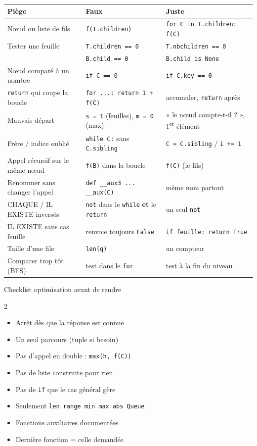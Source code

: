 \documentclass[10pt,a4paper]{article}
\newcommand{\code}[1]{\texttt{#1}}
\newcommand{\tc}[1]{\textcolor{treec}{\texttt{#1}}}   %
\newcommand{\bc}[1]{\textcolor{tabc}{\texttt{#1}}}    %
\begin{document}
\begin{center}
\renewcommand{\arraystretch}{1.13}
\begin{tabular}{l >{\color{ko}}l >{\color{ok}}l}
\toprule
\textbf{Pi\`ege} & \textbf{\color{ko}Faux} & \textbf{\color{ok}Juste}\\
\midrule
N\oe ud ou liste de fils & \tc{f(T.children)} & \tc{for C in T.children: f(C)}\\
Tester une feuille & \tc{T.children == 0} & \tc{T.nbchildren == 0}\\
 & \bc{B.child == 0} & \bc{B.child is None}\\
N\oe ud compar\'e \`a un nombre & \code{if C == 0} & \code{if C.key == 0}\\
\code{return} qui coupe la boucle & \code{for ...: return 1 + f(C)} & accumuler, \code{return} apr\`es\\
Mauvais d\'epart & \code{s = 1} (feuilles), \code{m = 0} (max) & « le n\oe ud compte-t-il ? », 1\textsuperscript{er} \'el\'ement\\
Fr\`ere / indice oubli\'e & \bc{while C:} sans \bc{C.sibling} & \bc{C = C.sibling} \; / \; \tc{i += 1}\\
Appel r\'ecursif sur le m\^eme n\oe ud & \code{f(B)} dans la boucle & \code{f(C)} (le fils)\\
Renommer sans changer l'appel & \code{def \_\_aux3 ... \_\_aux(C)} & m\^eme nom partout\\
CHAQUE / IL EXISTE invers\'es & \code{not} dans le \code{while} \textbf{et} le \code{return} & un seul \code{not}\\
IL EXISTE sans cas feuille & renvoie toujours \code{False} & \code{if feuille: return True}\\
Taille d'une file & \code{len(q)} & un compteur\\
Comparer trop t\^ot (BFS) & test dans le \code{for} & test \`a la fin du niveau\\
\bottomrule
\end{tabular}
\end{center}

\begin{boxok}{Checklist optimisation avant de rendre}
\begin{multicols}{2}
\begin{itemize}[label=$\square$]
\item Arr\^et d\`es que la r\'eponse est connue
\item Un seul parcours (tuple si besoin)
\item Pas d'appel en double : \code{max(h, f(C))}
\item Pas de liste construite pour rien
\item Pas de \code{if} que le cas g\'en\'eral g\`ere
\item Seulement \code{len range min max abs Queue}
\item Fonctions auxiliaires document\'ees
\item Derni\`ere fonction = celle demand\'ee
\end{itemize}
\end{multicols}
\end{boxok}
\end{document}

